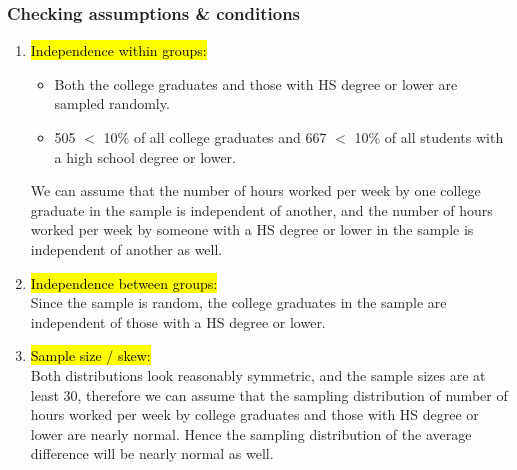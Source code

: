 
\begin{frame}[shrink]
\frametitle{Checking assumptions \& conditions}

\begin{enumerate}

\item \hl{Independence within groups: }
\begin{itemize}
\item Both the college graduates and those with HS degree or lower are sampled randomly.
\pause
\item 505 $<$ 10\% of all college graduates and 667 $<$ 10\% of all students with a high school degree or lower.
\end{itemize}
\pause
We can assume that the number of hours worked per week by one college graduate in the sample is independent of another, and the number of hours worked per week by someone with a HS degree or lower in the sample is independent of another as well.

\pause

\item \hl{Independence between groups: }  \\
Since the sample is random, the college graduates in the sample are independent of those with a HS degree or lower.

\pause

\item \hl{Sample size / skew:} \\
Both distributions look reasonably symmetric, and the sample sizes are at least 30, therefore we can assume that the sampling distribution of number of hours worked per week by college graduates and those with HS degree or lower are nearly normal. Hence the sampling distribution of the average difference will be nearly normal as well.

\end{enumerate}

\end{frame}


